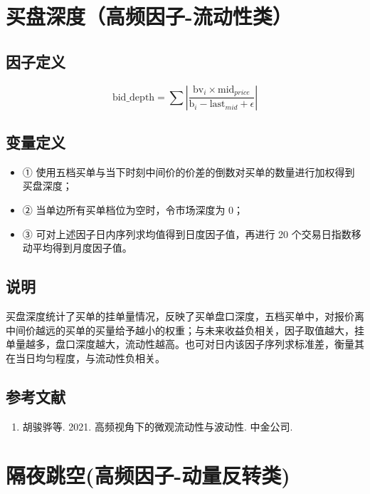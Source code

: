 \documentclass{article}
\begin{document}
\section{买盘深度（高频因子-流动性类）}

\subsection{因子定义}

\begin{equation}
    \mathrm{bid\_depth} = \sum \left| \frac{\mathrm{bv}_i \times \mathrm{mid}_{price}}{\mathrm{b}_i - \mathrm{last}_{mid} + \epsilon} \right|
\end{equation}

\subsection{变量定义}
\begin{itemize}
    \item ① 使用五档买单与当下时刻中间价的价差的倒数对买单的数量进行加权得到买盘深度；
    \item ② 当单边所有买单档位为空时，令市场深度为 0；
    \item ③ 可对上述因子日内序列求均值得到日度因子值，再进行 20 个交易日指数移动平均得到月度因子值。
\end{itemize}

\subsection{说明}
买盘深度统计了买单的挂单量情况，反映了买单盘口深度，五档买单中，对报价离中间价越远的买单的买量给予越小的权重；与未来收益负相关，因子取值越大，挂单量越多，盘口深度越大，流动性越高。也可对日内该因子序列求标准差，衡量其在当日均匀程度，与流动性负相关。

\subsection{参考文献}
\begin{enumerate}
    \item 胡骏骅等. 2021. 高频视角下的微观流动性与波动性. 中金公司.
\end{enumerate}

\section{隔夜跳空(高频因子-动量反转类)}
\end{document}
